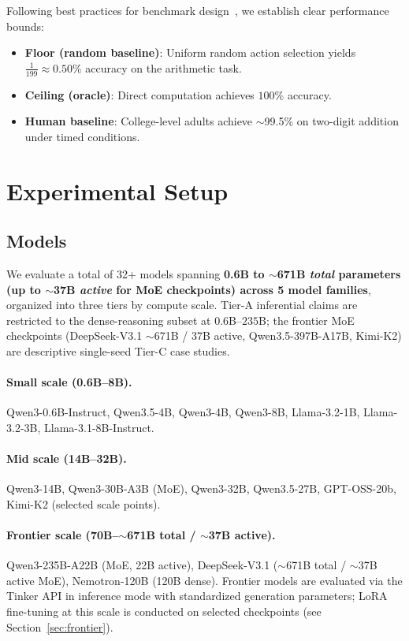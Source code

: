 \documentclass{article}
\begin{document}
Following best practices for benchmark design~\cite{agarwal2021deep}, we establish
clear performance bounds:

\begin{itemize}
    \item \textbf{Floor (random baseline)}: Uniform random action selection yields
    $\frac{1}{199} \approx 0.50\%$ accuracy on the arithmetic task.
    \item \textbf{Ceiling (oracle)}: Direct computation achieves $100\%$ accuracy.
    \item \textbf{Human baseline}: College-level adults achieve $\sim$99.5\% on
    two-digit addition under timed conditions.
\end{itemize}

\section{Experimental Setup}
\label{sec:setup}

\subsection{Models}

We evaluate a total of 32+ models spanning \textbf{0.6B to
$\sim$671B \emph{total} parameters (up to $\sim$37B \emph{active}
for MoE checkpoints) across 5 model families}, organized into three
tiers by compute scale. Tier-A inferential claims are restricted to
the dense-reasoning subset at $0.6$B--$235$B; the frontier MoE
checkpoints (DeepSeek-V3.1 $\sim$671B / 37B active, Qwen3.5-397B-A17B,
Kimi-K2) are descriptive single-seed Tier-C case studies.

\paragraph{Small scale (0.6B--8B).}
Qwen3-0.6B-Instruct, Qwen3.5-4B, Qwen3-4B, Qwen3-8B,
Llama-3.2-1B, Llama-3.2-3B, Llama-3.1-8B-Instruct.

\paragraph{Mid scale (14B--32B).}
Qwen3-14B, Qwen3-30B-A3B (MoE), Qwen3-32B, Qwen3.5-27B,
GPT-OSS-20b, Kimi-K2 (selected scale points).

\paragraph{Frontier scale (70B--$\sim$671B total / $\sim$37B active).}
Qwen3-235B-A22B (MoE, 22B active), DeepSeek-V3.1 ($\sim$671B total /
$\sim$37B active MoE), Nemotron-120B (120B dense).
Frontier models are evaluated via the Tinker API in inference mode
with standardized generation parameters; LoRA fine-tuning at this
scale is conducted on selected checkpoints (see Section~\ref{sec:frontier}).
\end{document}
